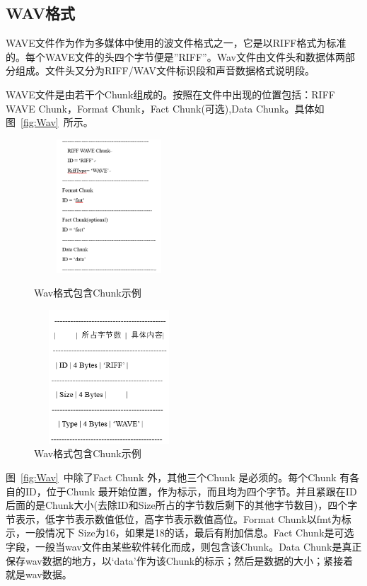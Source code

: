 \subsection{WAV格式}
WAVE文件作为作为多媒体中使用的波文件格式之一，它是以RIFF格式为标准的。每个WAVE文件的头四个字节便是”RIFF”。Wav文件由文件头和数据体两部分组成。文件头又分为RIFF/WAV文件标识段和声音数据格式说明段。


WAVE文件是由若干个Chunk组成的。按照在文件中出现的位置包括：RIFF WAVE Chunk，Format Chunk，Fact Chunk(可选),Data Chunk。具体如图~\ref{fig:Wav}~所示。

\begin{figure}[htbp]%
\centering
\begin{minipage}[Wav格式包含Chunk示例]{0.5\linewidth}
\centering
  \includegraphics[width=0.5\textwidth,height=5cm]{figures/Wav.png}
\caption{Wav格式包含Chunk示例}\label{fig:Wav}
\end{minipage}%
\begin{minipage}[RIFF WAVE Chunk]{0.5\linewidth}
\centering
 \includegraphics[width=0.5\textwidth,height=5cm]{figures/RIFF.png}
\caption{Wav格式包含Chunk示例}\label{fig:RIFF}
\end{minipage}%
\end{figure}

图~\ref{fig:Wav}~中除了Fact Chunk 外，其他三个Chunk 是必须的。每个Chunk 有各自的ID，位于Chunk 最开始位置，作为标示，而且均为四个字节。并且紧跟在ID后面的是Chunk大小(去除ID和Size所占的字节数后剩下的其他字节数目)，四个字节表示，低字节表示数值低位，高字节表示数值高位。Format Chunk以fmt为标示，一般情况下 Size为16，如果是18的话，最后有附加信息。Fact Chunk是可选字段，一般当wav文件由某些软件转化而成，则包含该Chunk。Data Chunk是真正保存wav数据的地方，以‘data’作为该Chunk的标示；然后是数据的大小；紧接着就是wav数据。


